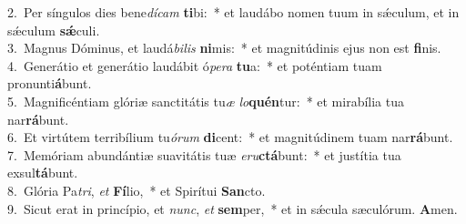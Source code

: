 {2.~}Per síngulos dies bene\textit{dí}\textit{cam} \textbf{ti}bi:~* et laudábo nomen tuum in sǽculum, et in sǽculum \textbf{sǽ}culi.\\
{3.~}Magnus Dóminus, et laudá\textit{bi}\textit{lis} \textbf{ni}mis:~* et magnitúdinis ejus non est \textbf{fi}nis.\\
{4.~}Generátio et generátio laudábit ó\textit{pe}\textit{ra} \textbf{tu}a:~* et poténtiam tuam pronunti\textbf{á}bunt.\\
{5.~}Magnificéntiam glóriæ sanctitátis tu\textit{æ} \textit{lo}\textbf{quén}tur:~* et mirabília tua nar\textbf{rá}bunt.\\
{6.~}Et virtútem terribílium tu\textit{ó}\textit{rum} \textbf{di}cent:~* et magnitúdinem tuam nar\textbf{rá}bunt.\\
{7.~}Memóriam abundántiæ suavitátis tuæ \textit{e}\textit{ru}\textbf{ctá}bunt:~* et justítia tua exsul\textbf{tá}bunt.\\
{8.~}Glória Pa\textit{tri}, \textit{et} \textbf{Fí}lio,~* et Spirítui \textbf{San}cto.\\
{9.~}Sicut erat in princípio, et \textit{nunc}, \textit{et} \textbf{sem}per,~* et in sǽcula sæculórum. \textbf{A}men.\\
